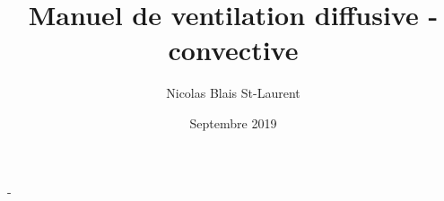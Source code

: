 \documentclass[letterpaper]{memoir}
\title{Manuel de ventilation diffusive - convective}
\author{Nicolas Blais St-Laurent}
\date{Septembre 2019}
\begin{document}
\begin{titlingpage}
\calccentering{\unitlength}
	\begin{adjustwidth*}{\unitlength}{-\unitlength}
	\maketitle
	\end{adjustwidth*}
\end{titlingpage}
%

\tableofcontents





\printbibliography
\end{document}
